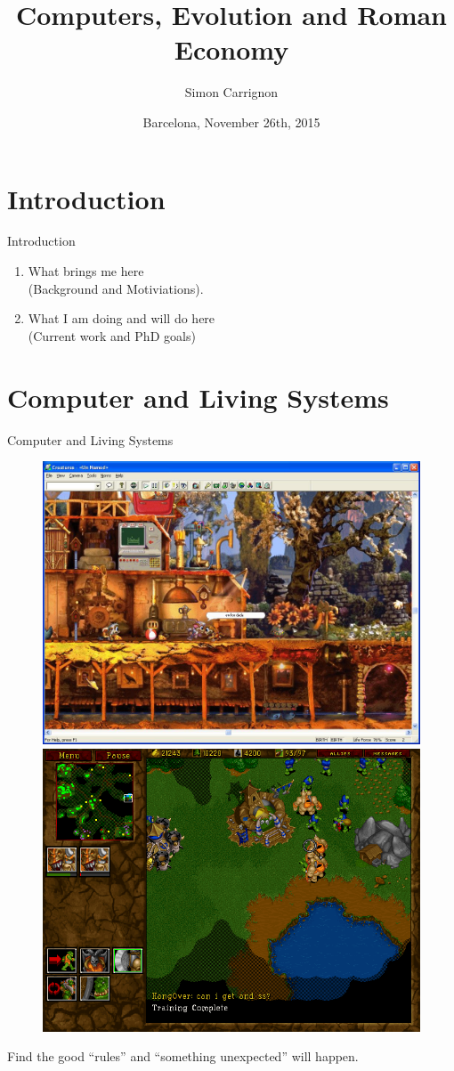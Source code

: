 \documentclass[8pt, handout=show,notes=show]{beamer}
\title{
    Computers, Evolution and Roman Economy
}
\date{Barcelona, November 26th, 2015}
\author{Simon Carrignon}
\begin{document}
\begin{frame}
	\maketitle

\end{frame}

\section{Introduction}
\begin{frame}{Introduction}
    \begin{enumerate}
	\item What brings me here\\ \hspace{1cm} (Background and Motiviations).
	    \vfill
	\item What I am doing and will do here\\ \hspace{1cm} (Current work and PhD goals)
    \end{enumerate}

\end{frame}

\section{Computer and Living Systems}

\begin{frame}{Computer and Living Systems}
    \begin{figure}
	    \includegraphics[width=.45\textwidth]{images/creatures.jpg}\hspace{.5cm}
	\includegraphics[width=.45\textwidth]{images/war2.png}
    \end{figure}
    Find the good ``rules'' and ``something unexpected'' will happen.
\end{frame}
\end{document}
